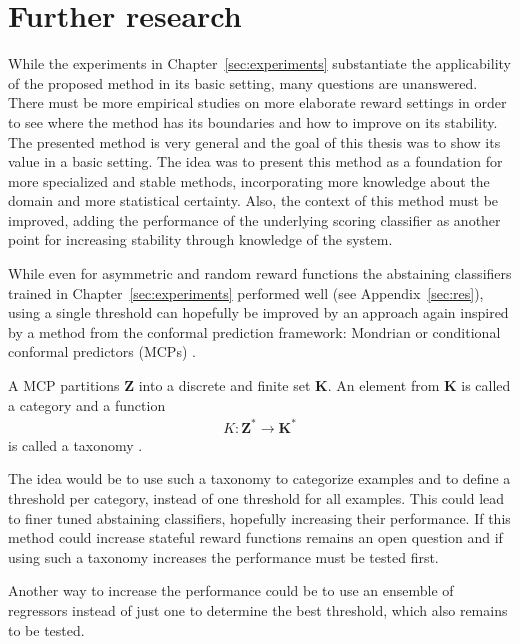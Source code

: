 \documentclass[twoside,11pt]{article}
\def\Z{\textbf{Z}}
\begin{document}

\section{Further research}
\label{sec:further_research}

While the experiments in Chapter~\ref{sec:experiments}
substantiate the applicability of the proposed method in
its basic setting, many questions are unanswered.
There must be more empirical studies on more elaborate
reward settings in order to see where the method has its
boundaries and how to improve on its stability.
The presented method is very general and the goal of this
thesis was to show its value in a basic setting.
The idea was to present this method as a foundation for
more specialized and stable methods, incorporating more
knowledge about the domain and more statistical certainty.
Also, the context of this method must be improved,
adding the performance of the underlying scoring classifier
as another point for increasing stability through knowledge
of the system.

While even for asymmetric and random reward functions the
abstaining classifiers trained in
Chapter~\ref{sec:experiments} performed well
(see Appendix~\ref{sec:res}), using a single threshold
can hopefully be improved by an approach again inspired by
a method from the conformal prediction framework:
Mondrian or conditional conformal predictors (MCPs)
\citep[see][]{alrw, cprml, fassbender_2019}.

\def\K{\textbf{K}}

A MCP partitions $\Z$ into a discrete and finite set
$\K$. An element from $\K$ is called a category and
a function
\begin{align*}
  K: \Z^* \rightarrow \K^*
\end{align*}
is called a taxonomy \citep[see][Chapter 2]{cprml}.

The idea would be to use such a taxonomy to categorize
examples and to define a threshold per category, instead of
one threshold for all examples.
This could lead to finer tuned abstaining classifiers,
hopefully increasing their performance.
If this method could increase stateful reward functions
remains an open question and if using such a taxonomy
increases the performance must be tested first.

Another way to increase the performance could be to use
an ensemble of regressors instead of just one to determine
the best threshold, which also remains to be tested.
\end{document}
